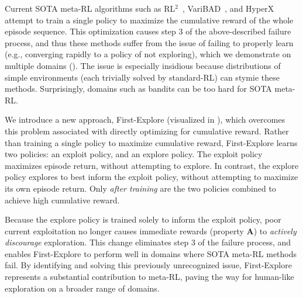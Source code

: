 \documentclass{article}
\begin{document}
Current SOTA meta-RL algorithms such as RL\(^2\)~\citep{rl2, rl2alt}, VariBAD~\citep{VariBAD}, and HyperX~\citep{hyperx} attempt to train a single policy to maximize the cumulative reward of the whole episode sequence. This optimization causes step 3 of the above-described failure process, and thus these methods suffer from the issue of failing to properly learn (e.g., converging rapidly to a policy of not exploring), which we demonstrate on multiple domains (). The issue is especially insidious because distributions of simple environments (each trivially solved by standard-RL) can stymie these methods. Surprisingly, domains such as bandits can be too hard for SOTA meta-RL.

We introduce a new approach, First-Explore (visualized in ), which overcomes this problem associated with directly optimizing for cumulative reward.
%
Rather than training a single policy to maximize cumulative reward, First-Explore learns two policies: an exploit policy, and an explore policy. The exploit policy maximizes episode return, without attempting to explore. In contrast, the explore policy explores to best inform the exploit policy, without attempting to maximize its own episode return. Only \emph{after training} are the two policies combined to achieve high cumulative reward.

Because the explore policy is trained solely to inform the exploit policy, poor current exploitation no longer causes immediate rewards (property \textbf{A}) to \emph{actively discourage} exploration. This change eliminates step 3 of the failure process, and enables First-Explore to perform well in domains where SOTA meta-RL methods fail. By identifying and solving this previously unrecognized issue, First-Explore represents a substantial contribution to meta-RL, paving the way for human-like exploration on a broader range of domains.
\end{document}
